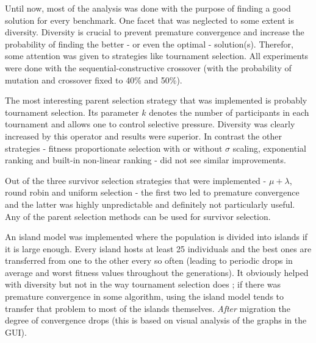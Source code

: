
Until now, most of the analysis was done with the purpose of finding a good solution for every benchmark. One facet that was neglected to some extent is diversity. Diversity is crucial to prevent premature convergence and increase the probability of finding the better - or even the optimal - solution(s). Therefor, some attention was given to strategies like tournament selection. All experiments were done with the sequential-constructive crossover (with the probability of mutation and crossover fixed to 40\% and 50\%).


The most interesting parent selection strategy that was implemented is probably tournament selection. Its parameter $k$ denotes the number of participants in each tournament and allows one to control selective pressure. Diversity was clearly increased by this operator and results were superior. In contrast the other strategies - fitness proportionate selection with or without $\sigma$ scaling, exponential ranking and built-in non-linear ranking - did not see similar improvements.


Out of the three survivor selection strategies that were implemented - $\mu+\lambda$, round robin and uniform selection - the first two led to premature convergence and the latter was highly unpredictable and definitely not particularly useful. Any of the parent selection methods can be used for survivor selection.


An island model was implemented where the population is divided into islands if it is large enough. Every island hosts at least 25 individuals and the best ones are transferred from one to the other every so often (leading to periodic drops in average and worst fitness values throughout the generations). It obviously helped with diversity but not in the way tournament selection does ; if there was premature convergence in some algorithm, using the island model tends to transfer that problem to most of the islands themselves. \textit{After} migration the degree of convergence drops (this is based on visual analysis of the graphs in the GUI). \\

